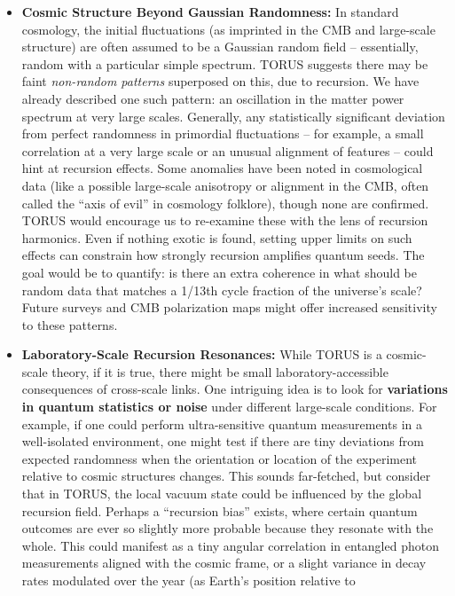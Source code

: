 \documentclass[]{article}
\begin{document}
\begin{itemize}
\item
  \textbf{Cosmic Structure Beyond Gaussian Randomness:} In standard
  cosmology, the initial fluctuations (as imprinted in the CMB and
  large-scale structure) are often assumed to be a Gaussian random field
  -- essentially, random with a particular simple spectrum. TORUS
  suggests there may be faint \emph{non-random patterns} superposed on
  this, due to recursion. We have already described one such pattern: an
  oscillation in the matter power spectrum at very large scales​.
  Generally, any statistically significant deviation from perfect
  randomness in primordial fluctuations -- for example, a small
  correlation at a very large scale or an unusual alignment of features
  -- could hint at recursion effects. Some anomalies have been noted in
  cosmological data (like a possible large-scale anisotropy or alignment
  in the CMB, often called the ``axis of evil'' in cosmology folklore),
  though none are confirmed. TORUS would encourage us to re-examine
  these with the lens of recursion harmonics. Even if nothing exotic is
  found, setting upper limits on such effects can constrain how strongly
  recursion amplifies quantum seeds. The goal would be to quantify: is
  there an extra coherence in what should be random data that matches a
  1/13th cycle fraction of the universe's scale? Future surveys and CMB
  polarization maps might offer increased sensitivity to these patterns.
\item
  \textbf{Laboratory-Scale Recursion Resonances:} While TORUS is a
  cosmic-scale theory, if it is true, there might be small
  laboratory-accessible consequences of cross-scale links. One
  intriguing idea is to look for \textbf{variations in quantum
  statistics or noise} under different large-scale conditions. For
  example, if one could perform ultra-sensitive quantum measurements in
  a well-isolated environment, one might test if there are tiny
  deviations from expected randomness when the orientation or location
  of the experiment relative to cosmic structures changes. This sounds
  far-fetched, but consider that in TORUS, the local vacuum state could
  be influenced by the global recursion field. Perhaps a ``recursion
  bias'' exists, where certain quantum outcomes are ever so slightly
  more probable because they resonate with the whole. This could
  manifest as a tiny angular correlation in entangled photon
  measurements aligned with the cosmic frame, or a slight variance in
  decay rates modulated over the year (as Earth's position relative to

\end{itemize}
\end{document}
